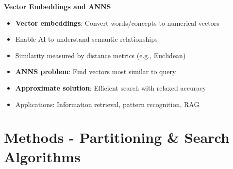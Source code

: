 \begin{frame}
\begin{center}
\LARGE\textbf{Vector Embeddings and ANNS}
\end{center}

\vspace{0.5cm}

\begin{itemize}
    \item \textbf{Vector embeddings}: Convert words/concepts to numerical vectors
    \item Enable AI to understand semantic relationships
    \item Similarity measured by distance metrics (e.g., Euclidean)
    \item \textbf{ANNS problem}: Find vectors most similar to query
    \item \textbf{Approximate solution}: Efficient search with relaxed accuracy
    \item Applications: Information retrieval, pattern recognition, RAG
\end{itemize}
\end{frame}%
\section[Methods - Partitioning \& Search Algorithms]{Methods - Partitioning \& Search Algorithms}%
